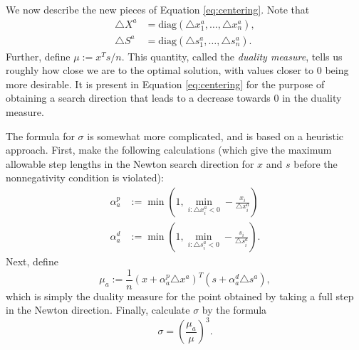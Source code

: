 We now describe the new pieces of Equation \ref{eq:centering}.
Note that
\begin{align*}
\triangle X^a &= \text{diag}(\triangle x_1^a,\ldots,\triangle x_n^a),\\
\triangle S^a &= \text{diag}(\triangle s_1^a,\ldots,\triangle s_n^a).
\end{align*}
Further,
define $\mu := x^Ts/n$. This quantity, called the \emph{duality measure}, tells us roughly how close we are
to the optimal solution, with values closer to 0 being more desirable. It is present in Equation \ref{eq:centering}
for the purpose of obtaining a search direction that leads to a decrease towards 0 in the duality measure.

The formula for $\sigma$ is somewhat more complicated, and
is based on a heuristic approach. First, make the following calculations (which give the maximum allowable step lengths in
the Newton search direction for $x$ and $s$ before the nonnegativity condition is violated):
\begin{align*}
\alpha_a^p &:= \min\left(1, \displaystyle\min_{i : \triangle x_i^a < 0}-\frac{x_i}{\triangle x_i^a}\right)\\
\alpha_a^d &:= \min\left(1, \displaystyle\min_{i : \triangle s_i^a < 0}-\frac{s_i}{\triangle s_i^a}\right).
\end{align*}
Next, define
\[
\mu_a := \frac{1}{n}(x+\alpha_a^p\triangle x^a)^T(s+\alpha_a^d\triangle s^a),
\]
which is simply the duality measure for the point obtained by taking a full step in the Newton direction.
Finally, calculate $\sigma$ by the formula
\[
\sigma = \left(\frac{\mu_a}{\mu}\right)^3.
\]


